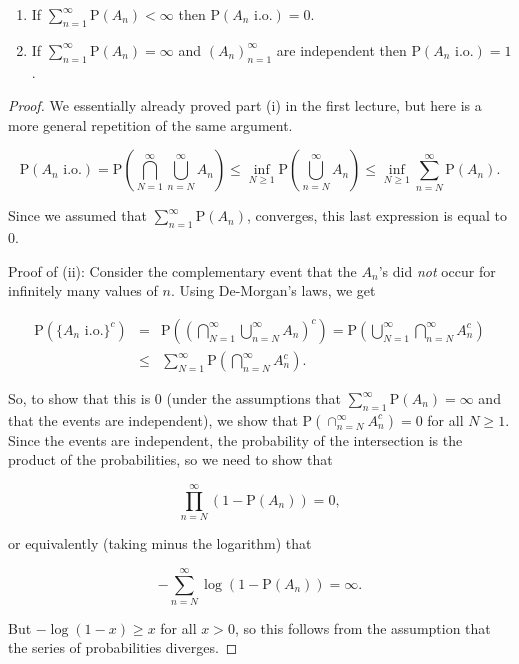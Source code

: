 \begin{thm}

\begin{enumerate}[label=(\roman*)]
\item If $\sum_{n=1}^\infty \mathrm{P}(A_n) < \infty$ then
$\mathrm{P}(A_n\textrm{ i.o.}) = 0$.

\item If $\sum_{n=1}^\infty \mathrm{P}(A_n) = \infty$ and
$(A_n)_{n=1}^\infty$ are independent then
$\mathrm{P}(A_n\textrm{ i.o.}) = 1$.
\end{enumerate}

\end{thm}

\begin{proof}
We essentially already proved part (i) in the first
lecture, but here is a more general repetition of the
same argument.

\[
\mathrm{P}(A_n\textrm{ i.o.}) = \mathrm{P}\left(\bigcap_{N=1}^\infty \bigcup_{n=N}^\infty A_n \right)
\le \inf_{N\ge1} \mathrm{P}\left( \bigcup_{n=N}^\infty A_n\right) \le
\inf_{N\ge 1} \sum_{n=N}^\infty \mathrm{P}(A_n).
\]

\noindent Since we assumed that
$\sum_{n=1}^\infty \mathrm{P}(A_n)$, converges, this
last expression is equal to $0$.

Proof of (ii): Consider the complementary event that
the $A_n$'s did \emph{not} occur for infinitely many
values of $n$. Using De-Morgan's laws, we get

\begin{eqnarray*}
\mathrm{P}(\{A_n\textrm{ i.o.}\}^c) &=& \mathrm{P}\left(\left(\bigcap_{N=1}^\infty \bigcup_{n=N}^\infty A_n\right)^c \right) = \mathrm{P}\left( \bigcup_{N=1}^\infty \bigcap_{n=N}^\infty A_n^c \right) \\
&\le &\sum_{N=1}^\infty \mathrm{P}\left( \bigcap_{n=N}^\infty A_n^c \right).
\end{eqnarray*}

\noindent So, to show that this is 0 (under the assumptions
that $\sum_{n=1}^\infty \mathrm{P}(A_n) = \infty$ and
that the events are independent), we show that
$\mathrm{P}\left( \cap_{n=N}^\infty A_n^c \right) =
0$
for all $N\ge 1$. Since the events are independent,
the probability of the intersection is the product of
the probabilities, so we need to show that

\[
\prod_{n=N}^\infty (1-\mathrm{P}(A_n)) = 0,
\]

\noindent or equivalently (taking minus the logarithm) that

\[
-\sum_{n=N}^\infty \log(1-\mathrm{P}(A_n)) = \infty.
\]

\noindent But $-\log(1-x) \ge x$ for all $x>0$, so this follows
from the assumption that the series of probabilities
diverges.
\end{proof}
